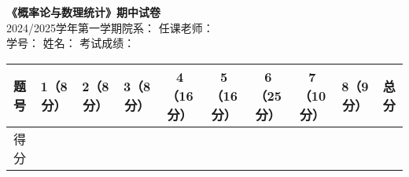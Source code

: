\documentclass[11pt,addpoints,landscape]{exam}
\begin{document}
	\begin{center}
		\textbf{《概率论与数理统计》期中试卷} \\
		2024/2025学年第一学期\hspace{0.3cm}院系：\underline{\hspace{1in}}\hspace{0.3cm} 任课老师：\underline{\hspace{1in}} \\
		学号：\underline{\hspace{1in}}\hspace{0.3cm} 姓名：\underline{\hspace{1in}}\hspace{0.3cm} 考试成绩：\underline{\hspace{1in}}
		\begin{tabular}{|c|c|c|c|c|c|c|c|c|c|}
			\hline
			题号 & 1（8分） & 2（8分） & 3（8分） & 4（16分） & 5（16分） & 6（25分） & 7（10分） & 8（9分） & 总分 \\
			\hline
			得分 &  &  &  &  &  &  &  &  &  \\
			\hline
		\end{tabular}
	\end{center} 
\end{document}
